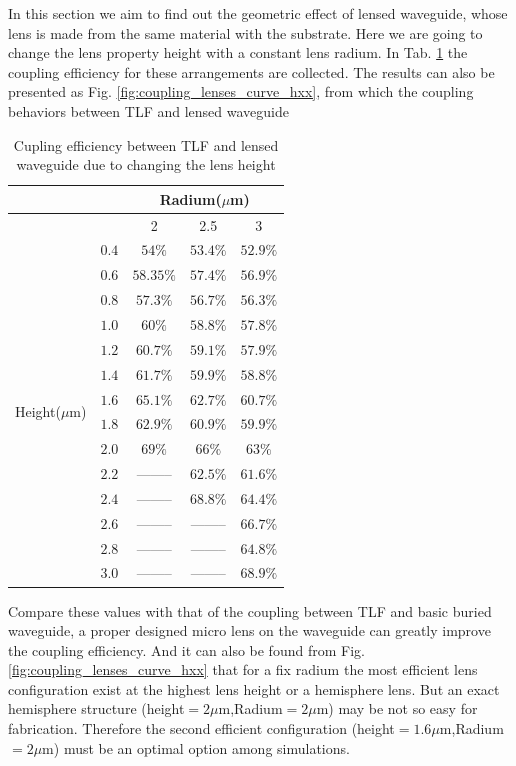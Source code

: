 
In this section we aim to find out the geometric effect of lensed waveguide, whose lens is made from the same material with the substrate. Here we are going to change the lens property height with a constant lens radium. In Tab. \ref{tab:coupling_lensed_waveguide_height} the coupling efficiency for these arrangements are collected. The results can also be presented as Fig. \ref{fig:coupling_lenses_curve_hxx}, from which the coupling behaviors between TLF and lensed waveguide    
\begin{table}
\caption{Cupling efficiency between TLF and lensed waveguide due to changing the lens height}
\centering
\begin{tabular}{|c|c|c|c|c|}
\hline
\multicolumn{2}{|c}{}&\multicolumn{3}{c|}{Radium($\mu$m)}\\
\hline
\multicolumn{2}{|c|}{}&	2&	2.5&	3\\
\hline
\multirow{14}{*}{Height($\mu$m)}&$0.4$&$54\%$&$53.4\%$&$52.9\%$\\
&$0.6$&$58.35\%$&$57.4\%$&$56.9\%$\\
&$0.8$&$57.3\%$&$56.7\%$&$56.3\%$\\
&$1.0$&$60\%$&$58.8\%$&$57.8\%$\\
&$1.2$&$60.7\%$&$59.1\%$&$57.9\%$\\
&$1.4$&$61.7\%$&$59.9\%$&$58.8\%$\\
&$1.6$&$65.1\%$&$62.7\%$&$60.7\%$\\
&$1.8$&$62.9\%$&$60.9\%$&$59.9\%$\\
&$2.0$&$69\%$  &  $66\%$&$63\%$\\
&$2.2$&--------&$62.5\%$&$61.6\%$\\
&$2.4$&--------&$68.8\%$&$64.4\%$\\
&$2.6$&--------&--------&$66.7\%$\\
&$2.8$&--------&--------&$64.8\%$\\
&$3.0$&--------&--------&$68.9\%$\\
\hline

\end{tabular}
\label{tab:coupling_lensed_waveguide_height}
\end{table}
Compare these values with that of the coupling between TLF and basic buried waveguide, a proper designed micro lens on the waveguide can greatly improve the coupling efficiency. And it can also be found from Fig. \ref{fig:coupling_lenses_curve_hxx} that for a fix radium the most efficient lens configuration exist at the highest lens height or a hemisphere lens. But an exact hemisphere structure (height$=2\mu$m,Radium$=2\mu$m) may be not so easy for fabrication. Therefore the second efficient configuration (height$=1.6\mu$m,Radium$=2\mu$m) must be  an optimal option among simulations. 
